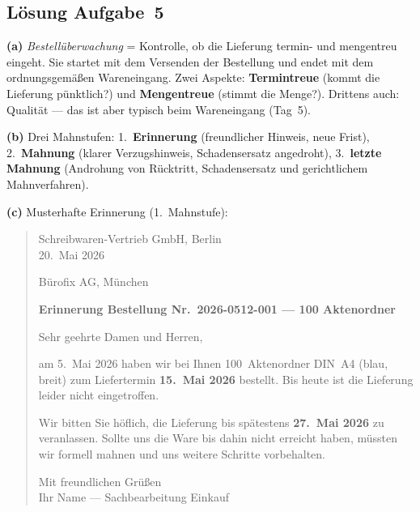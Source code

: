\documentclass[11pt, a4paper]{article}
\begin{document}
\subsection*{Lösung Aufgabe~5}
\begin{loesung}
\textbf{(a)} \emph{Bestellüberwachung} = Kontrolle, ob die Lieferung termin- und
mengentreu eingeht. Sie startet mit dem Versenden der Bestellung und endet mit dem
ordnungs\-gemäßen Wareneingang. Zwei Aspekte: \textbf{Termintreue} (kommt die Lieferung
pünktlich?) und \textbf{Mengentreue} (stimmt die Menge?). Drittens auch: Qualität ---
das ist aber typisch beim Wareneingang (Tag~5).

\textbf{(b)} Drei Mahnstufen: 1.~\textbf{Erinnerung} (freundlicher Hinweis, neue Frist),
2.~\textbf{Mahnung} (klarer Verzugs\-hinweis, Schadensersatz angedroht), 3.~\textbf{letzte
Mahnung} (Androhung von Rücktritt, Schadensersatz und gerichtlichem Mahnverfahren).

\textbf{(c)} Musterhafte Erinnerung (1.~Mahnstufe):

\begin{quote}\small
Schreibwaren-Vertrieb GmbH, Berlin \\
20.~Mai 2026

\medskip
Bürofix AG, München

\medskip
\textbf{Erinnerung Bestellung Nr.\ 2026-0512-001 --- 100 Aktenordner}

\medskip
Sehr geehrte Damen und Herren,

\medskip
am 5.~Mai 2026 haben wir bei Ihnen 100~Aktenordner DIN~A4 (blau, breit) zum Liefertermin
\textbf{15.~Mai 2026} bestellt. Bis heute ist die Lieferung leider nicht eingetroffen.

\medskip
Wir bitten Sie höflich, die Lieferung bis spätestens \textbf{27.~Mai 2026} zu veranlassen.
Sollte uns die Ware bis dahin nicht erreicht haben, müssten wir formell mahnen
und uns weitere Schritte vorbehalten.

\medskip
Mit freundlichen Grüßen \\
Ihr Name --- Sachbearbeitung Einkauf
\end{quote}
\end{loesung}
\end{document}
